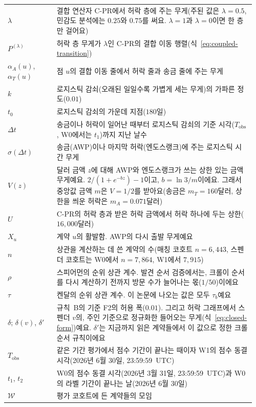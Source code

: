 \begin{longtable}{@{}>{\raggedright\arraybackslash}p{0.19\linewidth}p{0.77\linewidth}@{}}
$\lambda$ & 결합 연산자 \mbox{C-PR}에서 허락 층에 주는 무게(주된 값은 $\lambda=0.5$, 민감도 분석에는 $0.25$와 $0.75$를 써요. $\lambda=1$과 $\lambda=0$이면 한 층만 걸어요) \\
$P^{(\lambda)}$ & 허락 층 무게가 $\lambda$인 \mbox{C-PR}의 결합 이동 행렬(식~\eqref{eq:coupled-transition}) \\
$\alpha_A(u)$, $\alpha_T(u)$ & 점 $u$의 결합 이동 줄에서 허락 줄과 송금 줄에 주는 무게 \\
$k$ & 로지스틱 감쇠(오래된 일일수록 가볍게 세는 무게)의 가파른 정도($0.01$) \\
$t_0$ & 로지스틱 감쇠의 가운데 지점($180$일) \\
$\Delta t$ & 송금이나 허락이 일어난 때부터 로지스틱 감쇠의 기준 시각($T_{\mathrm{obs}}$, W0에서는 $t_1$)까지 지난 날수 \\
$\sigma(\Delta t)$ & 송금(AWP)이나 마지막 허락(엔도스랭크)에 주는 로지스틱 시간 무게 \\
$V(z)$ & 달러 금액 $z$에 대해 AWP와 엔도스랭크가 쓰는 상한 있는 금액 무게예요. $2/(1+e^{-bz})-1$이고, $b=\ln 3/m$이에요. 그래서 중앙값 금액 $m$은 $V=1/2$를 받아요(송금은 $m_T=160$달러, 상한을 씌운 허락은 $m_A=0.071$달러) \\
$U$ & \mbox{C-PR}의 허락 층과 받은 허락 금액에서 허락 하나에 두는 상한($16{,}000$달러) \\
$X_u$ & 계약 $u$의 활발함. AWP의 다시 출발 무게예요 \\
$n$ & 상관을 계산하는 데 쓴 계약의 수(매칭 코호트 $n=6{,}443$, 스펜더 코호트는 W0에서 $n=7{,}864$, W1에서 $7{,}915$) \\
$\rho$ & 스피어먼의 순위 상관 계수. 발견 순서 검증에서는, 크롤이 순서를 다시 계산하기 전까지 방문 수가 늘어나는 몫($1/50$)이에요 \\
$\tau$ & 켄달의 순위 상관 계수. 이 논문에 나오는 값은 모두 $\tau_b$예요 \\
$\delta$; $\delta(v)$, $\delta'$ & 규칙~B의 기준 F2의 허용 폭($0.01$). 그리고 허락 그래프에서 스펜더 $v$의, 주인 기준으로 정규화한 들어오는 무게(식~\eqref{eq:closed-form})예요. $\delta'$는 지금까지 읽은 계약들에서 이 값으로 정한 크롤 순서 규칙이에요 \\
$T_{\mathrm{obs}}$ & 같은 기간 평가에서 점수 기간이 끝나는 때이자 W1의 점수 동결 시각(2026년 6월 30일, 23:59:59~UTC) \\
$t_1$, $t_2$ & W0의 점수 동결 시각(2026년 3월 31일, 23:59:59~UTC)과 W0의 라벨 기간이 끝나는 날(2026년 6월 30일) \\
$\mathcal{W}$ & 평가 코호트에 든 계약들의 모임 \\

\end{longtable}
